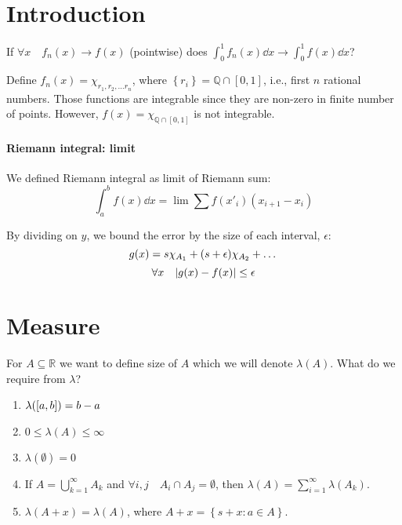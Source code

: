 \section{Introduction}
If $\forall x \quad f_n(x) \to f(x)$ (pointwise) does $\int_0^1 f_n(x) \dd{x} \to \int_0^1 f(x) \dd{x}$?

Define $f_n(x) = \chi_{r_1, r_2, \dots r_n}$, where $\left\{ r_i \right\} = \mathbb{Q} \cap [0,1]$, i.e., first $n$ rational numbers. Those functions are integrable since they are non-zero in finite number of points. However, $f(x) = \chi_{\mathbb{Q} \cap [0,1]}$ is not integrable.
\paragraph{Riemann integral: limit}
We defined Riemann integral as limit of Riemann sum:
$$\int_a^b f(x) \dd{x} = \lim \sum f(x'_i)(x_{i+1}-x_i)$$

\begin{center}
	
\end{center}

By dividing on $y$, we bound the error by the size of each interval, $\epsilon$:
$$g(x) = s\chi_{A_1} + \qty(s+\epsilon)\chi_{A_2} + \dots$$
$$\forall x \quad \abs{g(x)-f(x)} \leq \epsilon
$$
\section{Measure}
For $A\subseteq \mathbb{R}$ we want to define size of $A$ which we will denote $\lambda(A)$. What do we require from $\lambda$?
\begin{enumerate}
	\item $\lambda(\qty[a,b]) = b- a$
	\item $0\leq \lambda(A) \leq \infty$
	\item $\lambda(\emptyset) = 0$
	\item If $A = \bigcup_{k=1}^\infty A_k$ and $\forall i,j \quad A_i \cap A_j = \emptyset$, then $\lambda(A) = \sum_{i=1}^\infty \lambda(A_k)$.
	\item $\lambda(A+x) = \lambda(A)$, where $A+x = \left\{s+x: a\in A \right\}$.
\end{enumerate}

